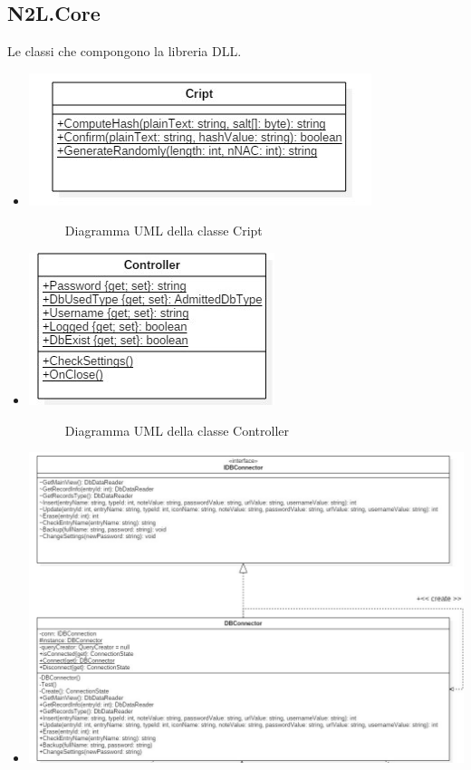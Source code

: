 \documentclass[a4paper,10pt]{report}
\begin{document}
		\subsection{N2L.Core}
			Le classi che compongono la libreria DLL.
			\begin{itemize}
				\item[] {
					\begin{center}
						\includegraphics[scale=1]{immagini/Cript.jpg}
						\end{center}
					\begin{figure}[!h]
							\caption{Diagramma UML della classe Cript}
						\end{figure}}
				\item[] {
					\begin{center}
						\includegraphics[scale=1]{immagini/Controller.jpg}
						\end{center}
					\begin{figure}[!h]
						\caption{Diagramma UML della classe Controller}
						\end{figure}}
				\item[] {
					\begin{center}
						\includegraphics[width=\textwidth]{immagini/DBConnector.jpg}

\end{center}}
\end{itemize}
\end{document}
